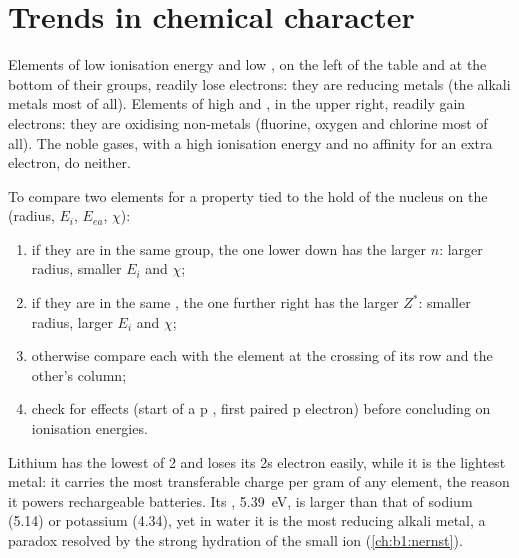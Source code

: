 \section{Trends in chemical character}

\begin{proposition}\label{prop:b1:periodicity:redox-trend}
Elements of low ionisation energy and low , on the left
of the table and at the bottom of their groups, readily lose electrons:
they are reducing metals (the alkali metals most of all). Elements of
high  and , in the upper right, readily
gain electrons: they are oxidising non-metals (fluorine, oxygen and
chlorine most of all). The noble gases, with a high ionisation energy and
no affinity for an extra electron, do neither.
\end{proposition}

\begin{method}\label{met:b1:periodicity:predict}
To compare two elements for a property tied to the hold of the nucleus
on the  (radius, $E_i$, $E_{ea}$, $\chi$):
\begin{enumerate}
  \item if they are in the same group, the one lower down has the larger
        $n$: larger radius, smaller $E_i$ and $\chi$;
  \item if they are in the same , the one further right has the
        larger $Z^{*}$: smaller radius, larger $E_i$ and $\chi$;
  \item otherwise compare each with the element at the crossing of its
        row and the other's column;
  \item check for  effects (start of a p , first paired p
        electron) before concluding on ionisation energies.
\end{enumerate}
\end{method}

\begin{example}\label{ex:b1:periodicity:lithium}
Lithium has the lowest  of  2 and loses its 2s
electron easily, while it is the lightest metal: it carries the most
transferable charge per gram of any element, the reason it powers
rechargeable batteries. Its , \qty{5.39}{eV}, is
larger than that of sodium (5.14) or potassium (4.34), yet in water it is
the most reducing alkali metal, a paradox resolved by the strong
hydration of the small  ion (\cref{ch:b1:nernst}).
\end{example}


